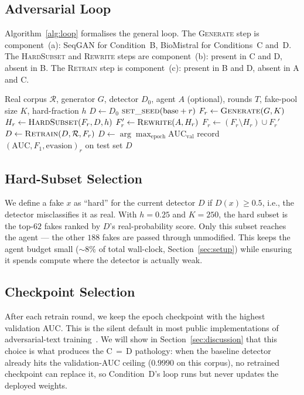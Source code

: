 \subsection{Adversarial Loop}
\label{ssec:loop}

Algorithm~\ref{alg:loop} formalises the general loop. The
\textsc{Generate} step is component~(a): SeqGAN for Condition~B,
BioMistral for Conditions~C and~D. The \textsc{HardSubset} and
\textsc{Rewrite} steps are component~(b): present in C and D, absent in
B. The \textsc{Retrain} step is component~(c): present in B and D,
absent in A and C.

\begin{algorithm}[t]
\caption{BioShield adversarial loop}
\label{alg:loop}
\begin{algorithmic}[1]
\REQUIRE Real corpus $\mathcal{R}$, generator $G$, detector $D_0$,
agent $A$ (optional), rounds $T$, fake-pool size $K$, hard-fraction $h$
\STATE $D \leftarrow D_0$  
  \STATE $\textsc{set\_seed}(\text{base} + r)$
  \STATE $F_r \leftarrow \textsc{Generate}(G, K)$
    \STATE $H_r \leftarrow \textsc{HardSubset}(F_r, D, h)$
    \STATE $F_r' \leftarrow \textsc{Rewrite}(A, H_r)$
    \STATE $F_r \leftarrow (F_r \setminus H_r) \cup F_r'$
  \ENDIF
    \STATE $D \leftarrow \textsc{Retrain}(D, \mathcal{R}, F_r)$
    \STATE $D \leftarrow \arg\max_{\text{epoch}} \mathrm{AUC}_{\text{val}}$
  \ENDIF
  \STATE record $(\mathrm{AUC}, F_1, \mathrm{evasion})_r$ on test set
\ENDFOR
\RETURN $D$
\end{algorithmic}
\end{algorithm}

\subsection{Hard-Subset Selection}
We define a fake $x$ as ``hard'' for the current detector $D$ if
$D(x) \geq 0.5$, i.e., the detector misclassifies it as real. With
$h = 0.25$ and $K = 250$, the hard subset is the top-\(62\) fakes ranked by
$D$'s real-probability score. Only this subset reaches the agent — the
other \(188\) fakes are passed through unmodified. This keeps the
agent budget small (\(\sim\!8\%\) of total wall-clock,
Section~\ref{sec:setup}) while ensuring it spends compute where the
detector is actually weak.

\subsection{Checkpoint Selection}
\label{ssec:checkpoint}
After each retrain round, we keep the epoch checkpoint with the highest
validation AUC. This is the silent default in most public implementations
of adversarial-text training~\cite{morris2020textattack,hu2023radar}. We will show in Section~\ref{sec:discussion}
that this choice is what produces the C\,$=$\,D pathology: when the
baseline detector already hits the validation-AUC ceiling
(\(0.9990\) on this corpus), no retrained checkpoint can replace it, so
Condition~D's loop runs but never updates the deployed weights.

